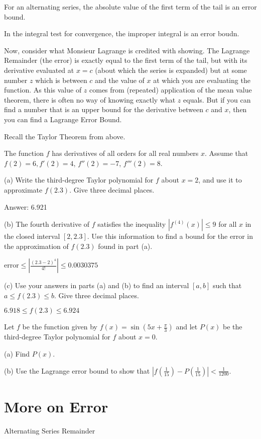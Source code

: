 \documentclass[../bccalc.tex]{subfiles}
\begin{document}
For an alternating series, the absolute value of the first term of the tail is an error bound.

In the integral test for convergence, the improper integral is an error boudn.

Now, consider what Monsieur Lagrange is credited with showing. The Lagrange Remainder (the error) is exactly equal to the first term of the tail, but with its derivative evaluated at $x=c$ (about which the series is expanded) but at some number $z$ which is between $c$ and the value of $x$ at which you are evaluating the function. As this value of $z$ comes from (repeated) application of the mean value theorem, there is often no way of knowing exactly what $z$ equals.
But if you can find a number that is an upper bound for the derivative between $c$ and $x$, then you can find a Lagrange Error Bound.

Recall the Taylor Theorem from above.

\pagebreak
\begin{example}
    The function $f$ has derivatives of all orders for all real numbers $x$. Assume that $f(2)=6, f'(2)=4$, $f''(2)=-7$, $f'''(2)=8$.

    (a) Write the third-degree Taylor polynomial for $f$ about $x=2$, and use it to approximate $f(2.3)$. Give three decimal places.

    Answer: 6.921
    
    (b) The fourth derivative of $f$ satisfies the inequality $|f^{(4)}(x)|\leq 9$ for all $x$ in the closed interval $[2,2.3]$. Use this information to find a bound for the error in the approximation of $f(2.3)$ found in part (a).

    error$\leq \left| \frac{(2.3-2)^4}{4!}\right| \leq 0.0030375$

    (c) Use your answers in parts (a) and (b) to find an interval $[a,b]$ such that $a\leq f(2.3)\leq b$. Give three decimal places.

    $6.918\leq f(2.3)\leq 6.924$
\end{example}

\ex Let $f$ be the function given by $f(x)=\sin\left(5x+\frac{\pi}{3}\right)$ and let $P(x)$ be the third-degree Taylor polynomial for $f$ about $x=0$. 

(a) Find $P(x)$.

(b) Use the Lagrange error bound to show that $\left| f\left(\frac{1}{15}\right)-P\left(\frac{1}{15}\right)\right|<\frac{1}{1200}$.

\section{More on Error}
Alternating Series Remainder 
\end{document}
